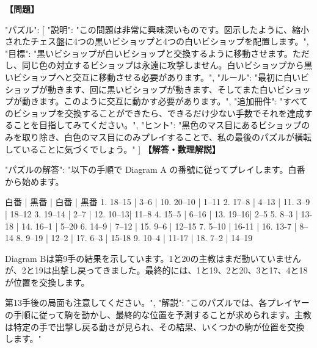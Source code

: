 \documentclass[10pt,a4paper,oneside,openany]{ltjsbook}
\begin{document}
\begin{tcolorbox}[colback=softblue,colframe=primaryblue,title=\textbf{第 327 問：A NEW BISHOP'S PUZZLE.},arc=2mm,boxrule=1pt,breakable]
\textbf{【問題】}\par\vspace{0.3em}
{
    "パズル": [
        {
            "説明": "この問題は非常に興味深いものです。図示したように、縮小されたチェス盤に4つの黒いビショップと4つの白いビショップを配置します。",
            "目標": "黒いビショップが白いビショップと交換するように移動させます。ただし、同じ色の対立するビショップは永遠に攻撃しません。白いビショップから黒いビショップへと交互に移動させる必要があります。",
            "ルール": "最初に白いビショップが動きます、回に黒いビショップが動きます、そしてまた白いビショップが動きます。このように交互に動かす必要があります。",
            "追加冊件": "すべてのビショップを交換することができたら、できるだけ少ない手数でそれを達成することを目指してみてください。",
            "ヒント": "黒色のマス目にあるビショップのみを取り除き、白色のマス目にのみプレイすることで、私の最後のパズルが橫転していることに気づくでしょう。"
        }
    ]
}
\tcblower
\textbf{【解答・数理解説】}\par\vspace{0.3em}
{
    "パズルの解答": "以下の手順で Diagram A の番號に従ってプレイします。白番から始めます。

      白番 | 黒番 | 白番 | 黒番
1. 18--15 | 3--6   | 10. 20--10 | 1--11
2. 17--8  | 4--13  | 11. 3--9   | 18--12
3. 19--14 | 2--7   | 12. 10--13| 11--8
4. 15--5  | 6--16  | 13. 19--16| 2--5
5. 8--3   | 13-18  | 14. 16--1 | 5--20
6. 14--9  | 7--12  | 15. 9--6  | 12--15
7. 5--10  | 16-11  | 16. 13-7  | 8--14
8. 9--19  | 12--2  | 17. 6--3  | 15-18
9. 10--4  | 11-17  | 18. 7--2  | 14--19

Diagram Bは第9手の結果を示しています。1と20の主教はまだ動いていませんが、2と19は出撃し戻ってきました。最終的には、1と19、2と20、3と17、4と18が位置を交換します。

第13手後の局面も注意してください。",
    "解説": "このパズルでは、各プレイヤーの手順に従って駒を動かし、最終的な位置を予測することが求められます。主教は特定の手で出撃し戻る動きが見られ、その結果、いくつかの駒が位置を交換します。"
}
\end{tcolorbox}
\end{document}
